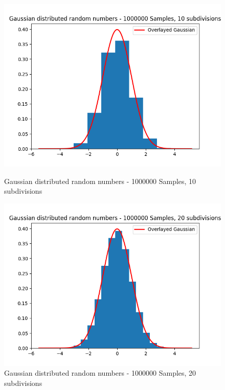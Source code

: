 \documentclass[11pt]{article}
\begin{document}
\begin{figure}[H]
    \centering
    \begin{minipage}{0.48\textwidth}
        \centering
        \includegraphics[width=\textwidth]{Gaussian distributed random numbers - 1000000 Samples, 10 subdivisions.png}
        \caption{Gaussian distributed random numbers - 1000000 Samples, 10 subdivisions}
        \label{fig:13}
    \end{minipage}\hfill
    \begin{minipage}{0.48\textwidth}
        \centering
        \includegraphics[width=\textwidth]{Gaussian distributed random numbers - 1000000 Samples, 20 subdivisions.png}
        \caption{Gaussian distributed random numbers - 1000000 Samples, 20 subdivisions}
        \label{fig:14}
    \end{minipage}
\end{figure}
\end{document}
